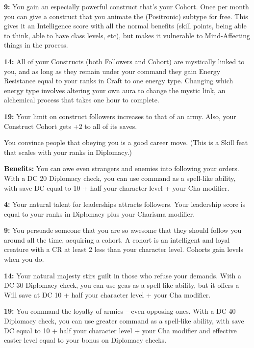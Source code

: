 \textbf{9:} You gain an especially powerful construct that's your Cohort. Once per month you can give a construct that you animate the (Positronic) subtype for free. This gives it an Intelligence score with all the normal benefits (skill points, being able to think, able to have class levels, etc), but makes it vulnerable to Mind-Affecting things in the process.

\textbf{14:} All of your Constructs (both Followers and Cohort) are mystically linked to you, and as long as they remain under your command they gain Energy Resistance equal to your ranks in Craft to one energy type. Changing which energy type involves altering your own aura to change the mystic link, an alchemical process that takes one hour to complete.

\textbf{19:} Your limit on construct followers increases to that of an army. Also, your Construct Cohort gets +2 to all of its saves.


You convince people that obeying you is a good career move. (This is a Skill feat that scales with your ranks in Diplomacy.)

\textbf{Benefits:} You can awe even strangers and enemies into following your orders. With a DC 20 Diplomacy check, you can use command as a spell-like ability, with save DC equal to 10 + half your character level + your Cha modifier.

\textbf{4:} Your natural talent for leaderships attracts followers. Your leadership score is equal to your ranks in Diplomacy plus your Charisma modifier.

\textbf{9:} You persuade someone that you are so awesome that they should follow you around all the time, acquiring a cohort. A cohort is an intelligent and loyal creature with a CR at least 2 less than your character level. Cohorts gain levels when you do.

\textbf{14:} Your natural majesty stirs guilt in those who refuse your demands. With a DC 30 Diplomacy check, you can use geas as a spell-like ability, but it offers a Will save at DC 10 + half your character level + your Cha modifier.

\textbf{19:} You command the loyalty of armies -- even opposing ones. With a DC 40 Diplomacy check, you can use greater command as a spell-like ability, with save DC equal to 10 + half your character level + your Cha modifier and effective caster level equal to your bonus on Diplomacy checks.

